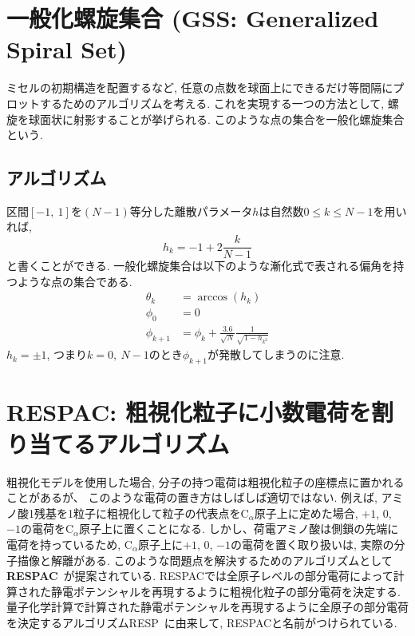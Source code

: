 \section{一般化螺旋集合 (GSS: Generalized Spiral Set)}
ミセルの初期構造を配置するなど, 任意の点数を球面上にできるだけ等間隔にプロットするためのアルゴリズムを考える. 
これを実現する一つの方法として, 螺旋を球面状に射影することが挙げられる. 
このような点の集合を一般化螺旋集合という. 

\subsection{アルゴリズム}
区間$[-1,~1]$を$(N-1)$等分した離散パラメータ$h$は自然数$0\le k \le N-1$を用いれば, 
\begin{equation}
    h_{k} = -1 + 2 \frac{k}{N-1}
\end{equation}
と書くことができる. 
一般化螺旋集合は以下のような漸化式で表される偏角を持つような点の集合である. 
\begin{align}
    \theta_{k} &= \arccos(h_{k}) \\
    \phi_{0} &= 0 \\
    \phi_{k+1} &= \phi_{k} + \frac{3.6}{\sqrt{N}} \frac{1}{\sqrt{1-h_{k^{2}}}}
\end{align}
$h_{k} = \pm 1$, つまり$k=0,~N-1$のとき$\phi_{k+1}$が発散してしまうのに注意. 

\clearpage

\section{RESPAC: 粗視化粒子に小数電荷を割り当てるアルゴリズム}
粗視化モデルを使用した場合, 分子の持つ電荷は粗視化粒子の座標点に置かれることがあるが、
このような電荷の置き方はしばしば適切ではない.
例えば, アミノ酸1残基を1粒子に粗視化して粒子の代表点をC$_\alpha$原子上に定めた場合, $+1$, $0$, $-1$の電荷をC$_\alpha$原子上に置くことになる. しかし、荷電アミノ酸は側鎖の先端に電荷を持っているため, C$_\alpha$原子上に$+1$, $0$, $-1$の電荷を置く取り扱いは, 実際の分子描像と解離がある.
このような問題点を解決するためのアルゴリズムとして\textbf{RESPAC}~\cite{Terakawa2014}が提案されている.
RESPACでは全原子レベルの部分電荷によって計算された静電ポテンシャルを再現するように粗視化粒子の部分電荷を決定する.
量子化学計算で計算された静電ポテンシャルを再現するように全原子の部分電荷を決定するアルゴリズムRESP~\cite{Bayly1993, Besler1990}に由来して, RESPACと名前がつけられている.

